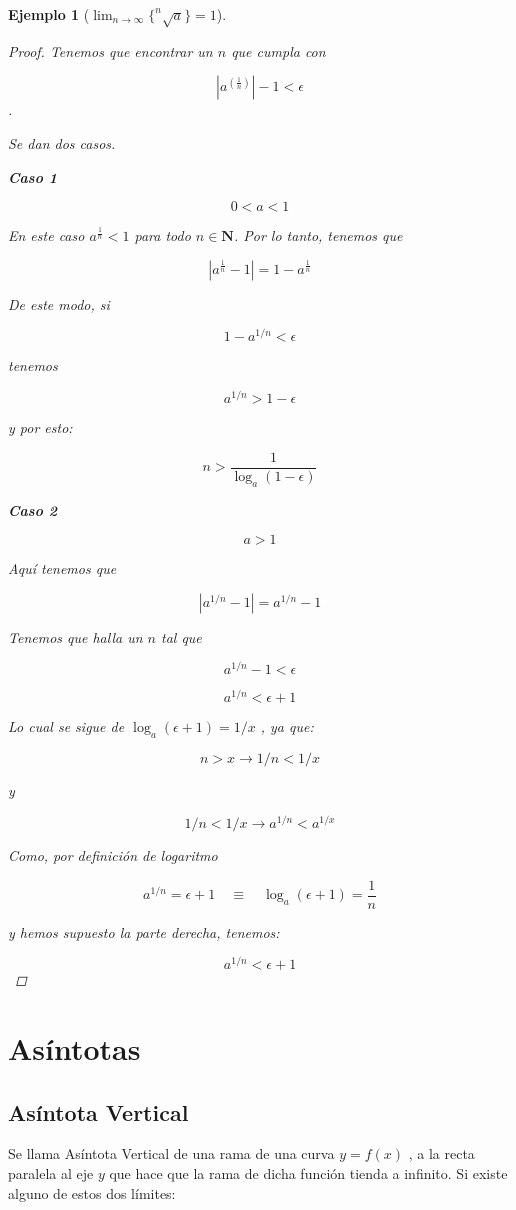 \message{ !name(analisis-mat.tex)}\documentclass[12pt,a4paper]{article}
\newtheorem{ejs}{Ejemplo}[section]
\begin{document}
\begin{ejs}[\(\lim_{n \to \infty} \{ ^n\sqrt{a}  \} = 1\)]
\begin{proof}
Tenemos que encontrar un \( n \) que cumpla con 

\[ |a^{(\frac{1}{n})}| - 1 < \epsilon \].

Se dan dos casos.

\textbf{Caso 1}

\[ 0<a<1 \]

En este caso \( a^{\frac{1}{n}} < 1 \) para todo \( n \in \mathbf{N}
\). Por lo tanto, tenemos que


\[ |a^{\frac{1}{n}}-1| = 1 - a^{\frac{1}{n}} \]

De este modo, si


\[ 1 - a^{1/n} < \epsilon \]

tenemos


\[ a^{1/n} > 1 - \epsilon \]

y por esto:

\[ n > \frac{1 }{\log_a(1-\epsilon)} \]


\textbf{Caso 2}


\[ a > 1 \]

Aqu\'i tenemos que 


\[ | a^{1/n}-1| = a^{1/n}-1 \]

Tenemos que halla un \( n \) tal que

\[ a^{1/n}-1 < \epsilon \]

\[ a^{1/n} < \epsilon +1\]


Lo cual se sigue de \( \log_a(\epsilon+1)=1/x \) , ya que:


\[ n > x \to 1/n < 1/x \]

y


\[ 1/n < 1/x \to a^{1/n} < a^{1/x} \]

Como, por definici\'on de logaritmo


\[ a^{1/n} = \epsilon+1 \quad \equiv \quad \log_a(\epsilon+1) = \frac{1}{n} \]

y hemos supuesto la parte derecha, tenemos:


\[ a^{1/n} < \epsilon+1 \]
\end{proof}

\end{ejs}

\section{As\'intotas}

\subsection{As\'intota Vertical}
Se llama As\'intota Vertical de una rama de una curva \( y = f(x) \) , a la recta paralela al eje \( y \)  que hace que la rama de dicha funci\'on tienda a infinito. Si existe alguno de estos dos l\'imites:
\end{document}
